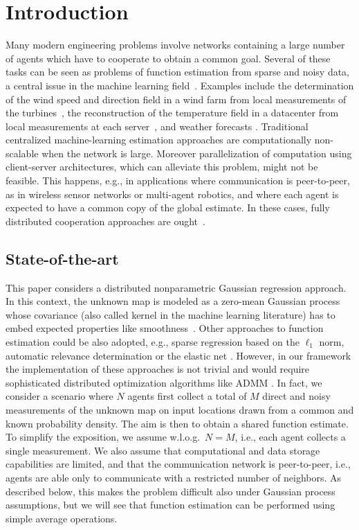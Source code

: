 \documentclass[10pt,twocolumn,twoside]{IEEEtran}					%
\theoremstyle	{plain}
\begin{document}
\section{Introduction}

Many modern engineering problems involve networks containing a large number of agents which have to cooperate to obtain a common goal. Several of these tasks can be seen as problems of function estimation from sparse and noisy data, a central issue in the machine learning field~\cite{Poggio90,Cucker01}. Examples include the determination of the wind speed and direction field in a wind farm from local measurements of the turbines~\cite{lei2009review}, the reconstruction of the temperature field in a datacenter from local measurements at each server~\cite{parolini2012cyber}, and weather forecasts \cite{Gelfand:05,Datta:16}. Traditional centralized machine-learning estimation approaches are computationally non-scalable when the network is large. Moreover parallelization of computation using client-server architectures, which can alleviate this problem, might not be feasible. This happens, e.g., in applications where communication is peer-to-peer, as in wireless sensor networks or multi-agent robotics, and where each agent is expected to have a common copy of the global estimate. In these cases, fully distributed cooperation approaches are ought~\cite{YunfeiXu2012}.
\vspace{-2mm}
\subsection{State-of-the-art}

This paper considers a distributed nonparametric Gaussian regression approach. In this context, the unknown map is modeled as a zero-mean Gaussian process whose covariance (also called kernel in the machine learning literature) has to embed expected properties like smoothness~\cite{Scholkopf01b,rasmussen_williams__2006__gaussian_processes_for_machine_learning}. Other approaches to function estimation could be also adopted, e.g., sparse regression based on the $\ell_1$ norm, automatic relevance determination or the elastic net \cite{Tibshirani96,MeinshausenYu09,ZouHuiHastie:2005,Wipf_ARD_NIPS_2007,ABCP14}. However, in our framework the implementation of these approaches is not trivial and would require sophisticated distributed optimization algorithms like ADMM \cite{Boyd2011}. In fact, we consider a scenario where $N$ agents first collect a total of $M$ direct and noisy measurements of the unknown map on input locations drawn from a common and known probability density. The aim is then to obtain a shared function estimate. To simplify the exposition, we assume w.l.o.g.\ $N=M$, i.e., each agent collects a single measurement. We also assume that computational and data storage capabilities are limited, and that the communication network is peer-to-peer, i.e., agents are able only to communicate with a restricted number of neighbors. As described below, this makes the problem difficult also under Gaussian process assumptions, but we will see that function estimation 
can be performed using simple average operations. 
\end{document}
